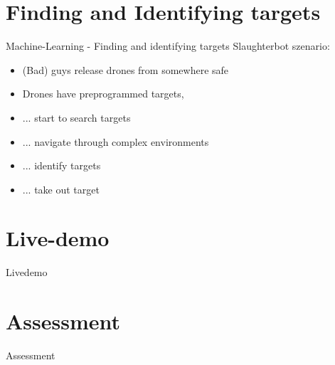 \documentclass[aspectratio=169]{beamer}
\begin{document}
\section{Finding and Identifying targets}
\begin{frame}{Machine-Learning - Finding and identifying targets}
	Slaughterbot szenario:
	\begin{itemize}
		\item (Bad) guys release drones from somewhere safe
		\item Drones have preprogrammed targets,
		\item ... start to search targets
		\item ... navigate through complex environments		
		\item ... identify targets
		\item ... take out target
	\end{itemize}
\end{frame}

\section{Live-demo}
\begin{frame}{Livedemo}
\end{frame}

\section{Assessment}
\begin{frame}{Assessment}
\end{frame}
\end{document}
